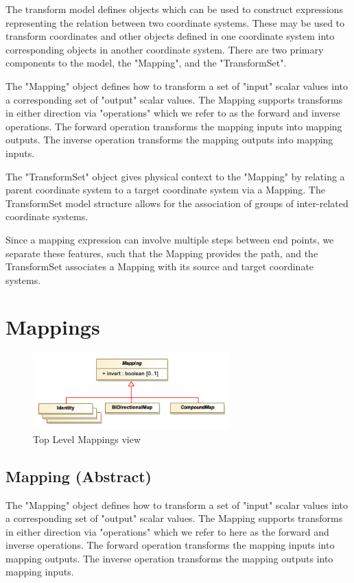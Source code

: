 \pagebreak
  The transform model defines objects which can be used to construct expressions representing the relation between two coordinate systems. These may be used to transform coordinates and other objects defined in one coordinate system into corresponding objects in another coordinate system. There are two primary components to the model, the "Mapping", and the "TransformSet". 

  The "Mapping" object defines how to transform a set of "input" scalar values into a corresponding set of "output" scalar values. The Mapping supports transforms in either direction via "operations" which we refer to as the forward and inverse operations. The forward operation transforms the mapping inputs into mapping outputs. The inverse operation transforms the mapping outputs into mapping inputs. 

  The "TransformSet" object gives physical context to the "Mapping" by relating a parent coordinate system to a target coordinate system via a Mapping. The TransformSet model structure allows for the association of groups of inter-related coordinate systems. 

  Since a mapping expression can involve multiple steps between end points, we separate these features, such that the Mapping provides the path, and the TransformSet associates a Mapping with its source and target coordinate systems.

\pagebreak
\section{Mappings}
  \begin{figure}[h]
  \begin{center}
    \includegraphics[width=3in]{diagrams/mappings_top.png}
    \caption{Top Level Mappings view}\label{fig:MapOps}
  \end{center}
  \end{figure}

  \subsection{Mapping (Abstract)}
  \label{sect:Mapping}
  The "Mapping" object defines how to transform a set of "input" scalar values into a corresponding set of "output" scalar values. The Mapping supports transforms in either direction via "operations" which we refer to here as the forward and inverse operations. The forward operation transforms the mapping inputs into mapping outputs. The inverse operation transforms the mapping outputs into mapping inputs. 

